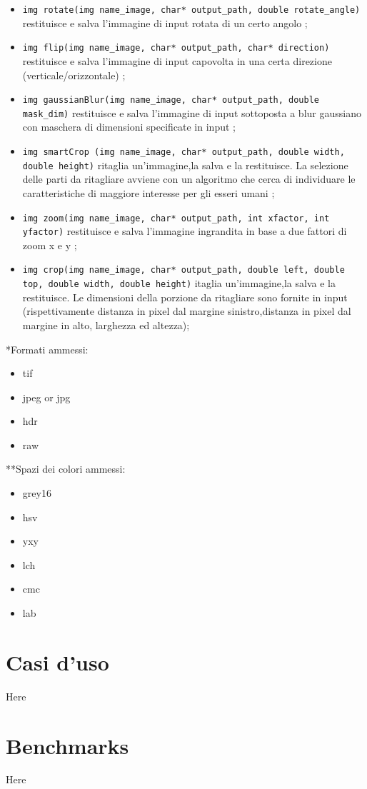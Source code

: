 \documentclass[10pt]{article}
\begin{document}
\begin{itemize}
\item \texttt{img rotate(img name\_image, char* output\_path, double rotate\_angle)} restituisce e salva l’immagine di input rotata di un certo angolo ;
\item \texttt{img flip(img name\_image, char* output\_path, char* direction)} restituisce e salva l’immagine di input capovolta in una certa direzione (verticale/orizzontale) ;
\item \texttt{img gaussianBlur(img name\_image, char* output\_path, double mask\_dim)} restituisce e salva l’immagine di input sottoposta a blur gaussiano con maschera di dimensioni specificate in input ;
\item \texttt{img smartCrop (img name\_image, char* output\_path, double width, double height)} ritaglia un’immagine,la salva e la restituisce. La selezione delle parti da ritagliare avviene con un algoritmo che cerca di individuare le caratteristiche di maggiore interesse per gli esseri umani ;
\item \texttt{img zoom(img name\_image, char* output\_path, int xfactor, int yfactor)} restituisce e salva l’immagine ingrandita in base a due fattori di zoom x e y ;
\item \texttt{img crop(img name\_image, char* output\_path, double left, double top, double width, double height)} itaglia un’immagine,la salva e la restituisce. Le dimensioni della porzione da ritagliare sono fornite in input (rispettivamente distanza in pixel dal margine sinistro,distanza in pixel dal margine in alto, larghezza ed altezza);
\end{itemize}

*Formati ammessi:
\begin{itemize}
	\item tif
	\item jpeg or jpg
	\item hdr
	\item raw
	\label{itm:formats}
\end{itemize}

**Spazi dei colori ammessi:
\begin{itemize}
	\item grey16
	\item hsv
	\item yxy
	\item lch
	\item cmc
	\item lab
\end{itemize}
\clearpage
\section{Casi d'uso}
Here
\clearpage
\section{Benchmarks}
Here
\end{document}
